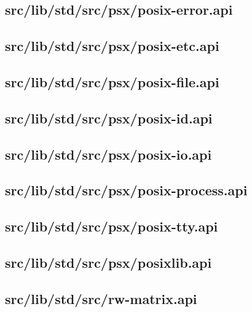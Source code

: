 \subsection{src/lib/std/src/psx/posix-error.api}


\subsection{src/lib/std/src/psx/posix-etc.api}


\subsection{src/lib/std/src/psx/posix-file.api}


\subsection{src/lib/std/src/psx/posix-id.api}


\subsection{src/lib/std/src/psx/posix-io.api}


\subsection{src/lib/std/src/psx/posix-process.api}


\subsection{src/lib/std/src/psx/posix-tty.api}


\subsection{src/lib/std/src/psx/posixlib.api}


\subsection{src/lib/std/src/rw-matrix.api}


